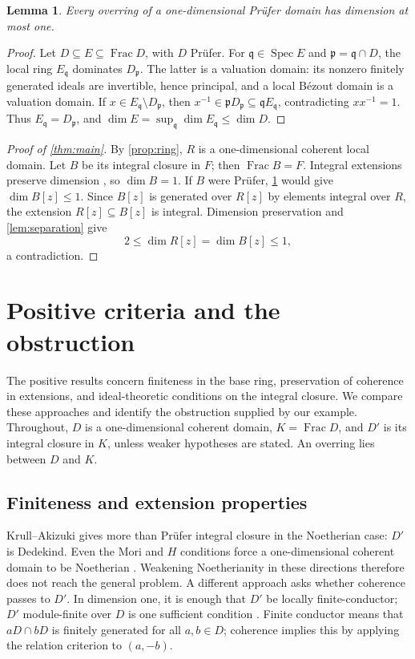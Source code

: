 \documentclass[11pt,reqno]{amsart}
\numberwithin{equation}{section}
\theoremstyle{plain}
\newtheorem{lemma}[theorem]{Lemma}
\DeclareMathOperator{\Frac}{Frac}
\DeclareMathOperator{\Spec}{Spec}
\begin{document}
\begin{lemma}\label{lem:prufer-overrings}
Every overring of a one-dimensional Pr\"ufer domain has dimension
at most one.
\end{lemma}
\begin{proof}
Let $D\subseteq E\subseteq\Frac D$, with $D$ Pr\"ufer. For
$\mathfrak q\in\Spec E$ and $\mathfrak p=\mathfrak q\cap D$,
the local ring $E_{\mathfrak q}$ dominates $D_{\mathfrak p}$.
The latter is a valuation domain: its nonzero finitely generated
ideals are invertible, hence principal, and a local B\'ezout domain
is a valuation domain. If $x\in E_{\mathfrak q}\setminus D_{\mathfrak p}$,
then $x^{-1}\in\mathfrak pD_{\mathfrak p}\subseteq
\mathfrak qE_{\mathfrak q}$, contradicting $x x^{-1}=1$.
Thus $E_{\mathfrak q}=D_{\mathfrak p}$, and
$\dim E=\sup_{\mathfrak q}\dim E_{\mathfrak q}\leq\dim D$.
\end{proof}

\begin{proof}[Proof of \cref{thm:main}]
By \cref{prop:ring}, $R$ is a one-dimensional coherent local domain.
Let $B$ be its integral closure in $F$; then $\Frac B=F$.
Integral extensions preserve dimension \cite[Tag~00OK]{StacksProject},
so $\dim B=1$.
If $B$ were Pr\"ufer, \cref{lem:prufer-overrings} would give
$\dim B[z]\leq1$. Since $B[z]$ is generated over $R[z]$ by elements
integral over $R$, the extension $R[z]\subseteq B[z]$ is integral.
Dimension preservation and \cref{lem:separation} give
\[
 2\leq\dim R[z]=\dim B[z]\leq1,
\]
a contradiction.
\end{proof}

\section{Positive criteria and the obstruction}\label{sec:literature}

The positive results concern finiteness in the base ring, preservation
of coherence in extensions, and ideal-theoretic conditions on the
integral closure. We compare these approaches and identify the obstruction
supplied by our example. Throughout, $D$ is a one-dimensional coherent
domain, $K=\Frac D$, and $D'$ is its integral closure in $K$, unless weaker
hypotheses are stated. An overring lies between $D$ and $K$.

\subsection{Finiteness and extension properties}
Krull--Akizuki gives more than Pr\"ufer integral closure in the Noetherian
case: $D'$ is Dedekind. Even the Mori and $H$ conditions force a
one-dimensional coherent domain to be Noetherian
\cite[p.~225]{GlazVasconcelos1984}. Weakening Noetherianity in these
directions therefore does not reach the general problem. A different
approach asks whether coherence passes to $D'$. In dimension one, it
is enough that $D'$ be locally finite-conductor; $D'$ module-finite
over $D$ is one sufficient condition
\cite[Thm.~3.7, Cor.~3.9]{PicozzaTartarone2008}.
Finite conductor means that $aD\cap bD$ is finitely generated for all
$a,b\in D$; coherence implies this by applying the relation criterion
to $(a,-b)$.
\end{document}
